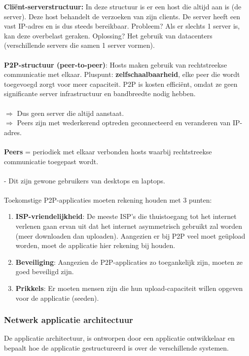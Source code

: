 \noindent \textbf{Cliënt-serverstructuur:} In deze structuur is er een host die altijd aan is (de server). Deze host behandelt de verzoeken van zijn clients. De server heeft een vast IP-adres en is dus steeds bereikbaar. Probleem? Als er slechts 1 server is, kan deze overbelast geraken. Oplossing? Het gebruik van datacenters (verschillende servers die samen 1 server vormen).\\\\
\textbf{P2P-structuur (peer-to-peer)}: Hosts maken gebruik van rechtstreekse communicatie met elkaar. Pluspunt: \textbf{zelfschaalbaarheid}, elke peer die wordt toegevoegd zorgt voor meer capaciteit. P2P is kosten efficiënt, omdat ze geen significante server infrastructuur en bandbreedte nodig hebben.\\\\
$\Rightarrow$ Dus geen server die altijd aanstaat.\\
$\Rightarrow$ Peers zijn met wederkerend optreden geconnecteerd en veranderen van IP-adres.\\\\
\textbf{Peers} = periodiek met elkaar verbonden hosts waarbij rechtstreekse communicatie toegepast wordt.\\\\
- Dit zijn gewone gebruikers van desktops en laptops.\\\\
Toekomstige P2P-applicaties moeten rekening houden met 3 punten:
\begin{enumerate}
\item \textbf{ISP-vriendelijkheid}: De meeste ISP’s die thuistoegang tot het internet verlenen gaan ervan uit dat het internet asymmetrisch gebruikt zal worden (meer downloaden dan uploaden). Aangezien er bij P2P veel moet geüpload worden, moet de applicatie hier rekening bij houden.
\item \textbf{Beveiliging}: Aangezien de P2P-applicaties zo toegankelijk zijn, moeten ze goed beveiligd zijn.
\item \textbf{Prikkels}: Er moeten mensen zijn die hun upload-capaciteit willen opgeven voor de applicatie (seeden).
\end{enumerate}

\subsubsection{Netwerk applicatie architectuur}

De applicatie architectuur, is ontworpen door een applicatie ontwikkelaar en bepaalt hoe de applicatie gestructureerd is over de verschillende systemen.

